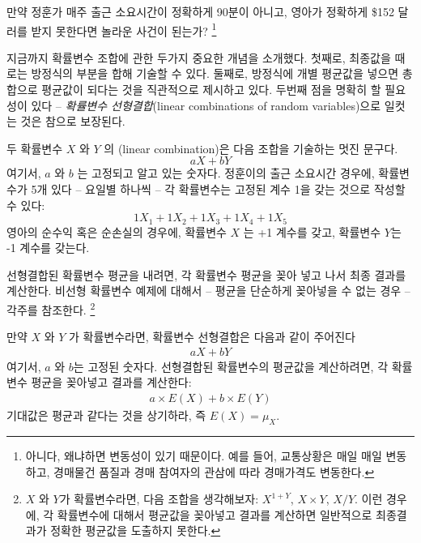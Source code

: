 \begin{exercise} \label{explainWhyThereIsUncertaintyInTheSum}
만약 정훈가 매주 출근 소요시간이 정확하게 90분이 아니고, 영아가 정확하게 \$152 달러를 받지 못한다면 놀라운 사건이 된는가?
\footnote{아니다, 왜냐하면 변동성이 있기 때문이다. 예를 들어, 교통상황은 매일 매일 변동하고, 경매물건 품질과 경매 참여자의 관삼에 따라 경매가격도 변동한다.}
\end{exercise}

지금까지 확률변수 조합에 관한 두가지 중요한 개념을 소개했다. 첫째로, 최종값을 때로는 방정식의 부분을 합해 기술할 수 있다. 둘째로, 방정식에 개별 평균값을 넣으면 총합으로 평균값이 되다는 것을 직관적으로 제시하고 있다. 두번째 점을 명확히 할 필요성이 있다 -- 
\emph{확률변수 선형결합}(linear combinations of random variables)으로 일컷는 것은 참으로 보장된다.

두 확률변수 $X$ 와 $Y$ 의 (linear combination)은 다음 조합을 기술하는 멋진 문구다.
$$ aX + bY$$
여기서, $a$ 와 $b$ 는 고정되고 알고 있는 숫자다. 정훈이의 출근 소요시간 경우에, 확률변수가 5개 있다 -- 요일별 하나씩 -- 각 확률변수는 고정된 계수 1을 갖는 것으로 작성할 수 있다:
$$ 1X_1 + 1 X_2 + 1 X_3 + 1 X_4 + 1 X_5 $$
영아의 순수익 혹은 순손실의 경우에, 확률변수 $X$ 는 +1 계수를 갖고, 확률변수 $Y$는 -1 계수를 갖는다.

선형결합된 확률변수 평균을 내려면, 각 확률변수 평균을 꽂아 넣고 나서 최종 결과를 계산한다. 비선형 확률변수 예제에 대해서 -- 평균을 단순하게 꽂아넣을 수 없는 경우 -- 각주를 참조한다.
\footnote{$X$ 와 $Y$가 확률변수라면, 다음 조합을 생각해보자: $X^{1+Y}$, $X\times Y$, $X/Y$. 이런 경우에, 각 확률변수에 대해서 평균값을 꽂아넣고 결과를 계산하면 일반적으로 최종결과가 정확한 평균값을 도출하지 못한다.}

\begin{termBox}{
만약 $X$ 와 $Y$ 가 확률변수라면, 확률변수 선형결합은 다음과 같이 주어진다
\begin{align}\label{linComboOfRandomVariablesXAndY}
aX + bY
\end{align}
여기서, $a$ 와 $b$는 고정된 숫자다. 선형결합된 확률변수의 평균값을 계산하려면, 각 확률변수 평균을 꽂아넣고 결과를 계산한다:
\begin{align*}
a\times E(X) + b\times E(Y)
\end{align*}
기대값은 평균과 같다는 것을 상기하라, 즉 $E(X) = \mu_X$.}
\end{termBox}

